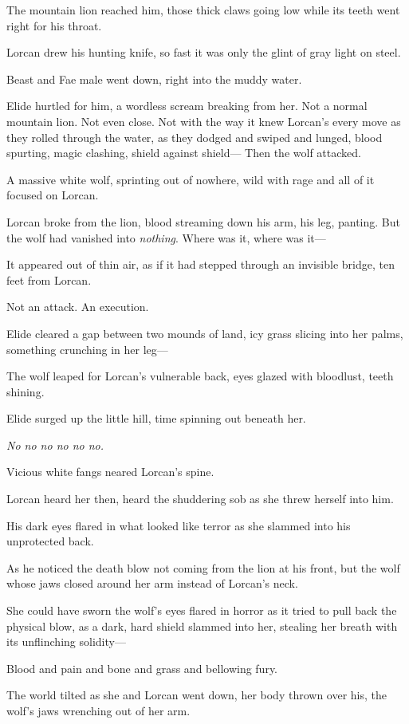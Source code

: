 The mountain lion reached him, those thick claws going low while its teeth went right for his throat.

Lorcan drew his hunting knife, so fast it was only the glint of gray light on steel.

Beast and Fae male went down, right into the muddy water.

Elide hurtled for him, a wordless scream breaking from her.
Not a normal mountain lion.
Not even close.
Not with the way it knew Lorcan's every move as they rolled through the water, as they dodged and swiped and lunged, blood spurting, magic clashing, shield against shield--- Then the wolf attacked.

A massive white wolf, sprinting out of nowhere, wild with rage and all of it focused on Lorcan.

Lorcan broke from the lion, blood streaming down his arm, his leg, panting.
But the wolf had vanished into \emph{nothing}.
Where was it, where was it---

It appeared out of thin air, as if it had stepped through an invisible bridge, ten feet from Lorcan.

Not an attack.
An execution.

Elide cleared a gap between two mounds of land, icy grass slicing into her palms, something crunching in her leg---

The wolf leaped for Lorcan's vulnerable back, eyes glazed with bloodlust, teeth shining.

Elide surged up the little hill, time spinning out beneath her.

\emph{No no no no no no.}

Vicious white fangs neared Lorcan's spine.

Lorcan heard her then, heard the shuddering sob as she threw herself into him.

His dark eyes flared in what looked like terror as she slammed into his unprotected back.

As he noticed the death blow not coming from the lion at his front, but the wolf whose jaws closed around her arm instead of Lorcan's neck.

She could have sworn the wolf's eyes flared in horror as it tried to pull back the physical blow, as a dark, hard shield slammed into her, stealing her breath with its unflinching solidity---

Blood and pain and bone and grass and bellowing fury.

The world tilted as she and Lorcan went down, her body thrown over his, the wolf's jaws wrenching out of her arm.

